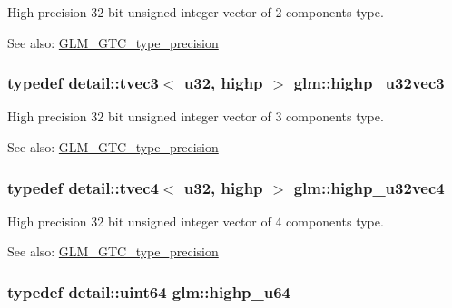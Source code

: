 High precision 32 bit unsigned integer vector of 2 components type. \begin{Desc}
\item[See also:]\hyperlink{group__gtc__type__precision}{GLM\_\-GTC\_\-type\_\-precision} \end{Desc}
\hypertarget{group__gtc__type__precision_gb1e386f5e415e00f800edf5d15207286}{
\subsubsection[highp\_\-u32vec3]{\setlength{\rightskip}{0pt plus 5cm}typedef detail::tvec3$<$ u32, highp $>$ {\bf glm::highp\_\-u32vec3}}}
\label{group__gtc__type__precision_gb1e386f5e415e00f800edf5d15207286}


High precision 32 bit unsigned integer vector of 3 components type. \begin{Desc}
\item[See also:]\hyperlink{group__gtc__type__precision}{GLM\_\-GTC\_\-type\_\-precision} \end{Desc}
\hypertarget{group__gtc__type__precision_g9418a8d549d344d4f7b7158771a2fdfe}{
\subsubsection[highp\_\-u32vec4]{\setlength{\rightskip}{0pt plus 5cm}typedef detail::tvec4$<$ u32, highp $>$ {\bf glm::highp\_\-u32vec4}}}
\label{group__gtc__type__precision_g9418a8d549d344d4f7b7158771a2fdfe}


High precision 32 bit unsigned integer vector of 4 components type. \begin{Desc}
\item[See also:]\hyperlink{group__gtc__type__precision}{GLM\_\-GTC\_\-type\_\-precision} \end{Desc}
\hypertarget{group__gtc__type__precision_g6006ea883d3c0491791650b2fb84de39}{
\subsubsection[highp\_\-u64]{\setlength{\rightskip}{0pt plus 5cm}typedef detail::uint64 {\bf glm::highp\_\-u64}}}
\label{group__gtc__type__precision_g6006ea883d3c0491791650b2fb84de39}


